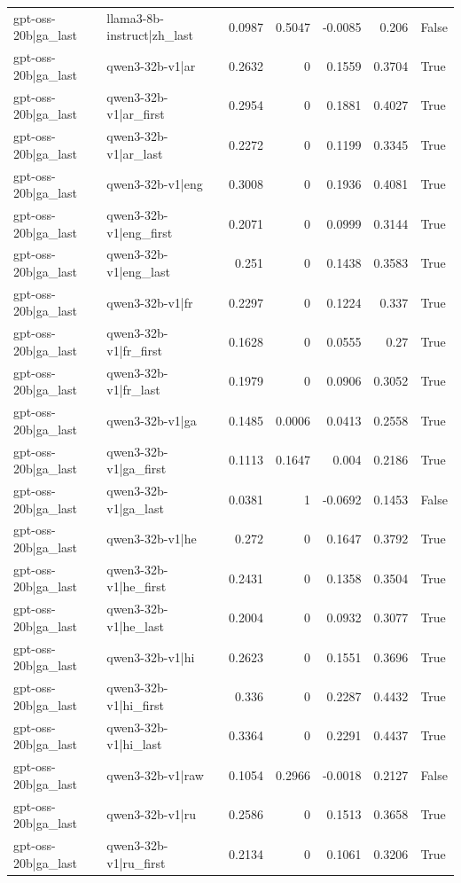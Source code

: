 \begin{table}
\begin{tabular}{l l r r r r l}
gpt-oss-20b|ga_last & llama3-8b-instruct|zh_last & 0.0987 & 0.5047 & -0.0085 & 0.206 & False \\
gpt-oss-20b|ga_last & qwen3-32b-v1|ar & 0.2632 & 0 & 0.1559 & 0.3704 & True \\
gpt-oss-20b|ga_last & qwen3-32b-v1|ar_first & 0.2954 & 0 & 0.1881 & 0.4027 & True \\
gpt-oss-20b|ga_last & qwen3-32b-v1|ar_last & 0.2272 & 0 & 0.1199 & 0.3345 & True \\
gpt-oss-20b|ga_last & qwen3-32b-v1|eng & 0.3008 & 0 & 0.1936 & 0.4081 & True \\
gpt-oss-20b|ga_last & qwen3-32b-v1|eng_first & 0.2071 & 0 & 0.0999 & 0.3144 & True \\
gpt-oss-20b|ga_last & qwen3-32b-v1|eng_last & 0.251 & 0 & 0.1438 & 0.3583 & True \\
gpt-oss-20b|ga_last & qwen3-32b-v1|fr & 0.2297 & 0 & 0.1224 & 0.337 & True \\
gpt-oss-20b|ga_last & qwen3-32b-v1|fr_first & 0.1628 & 0 & 0.0555 & 0.27 & True \\
gpt-oss-20b|ga_last & qwen3-32b-v1|fr_last & 0.1979 & 0 & 0.0906 & 0.3052 & True \\
gpt-oss-20b|ga_last & qwen3-32b-v1|ga & 0.1485 & 0.0006 & 0.0413 & 0.2558 & True \\
gpt-oss-20b|ga_last & qwen3-32b-v1|ga_first & 0.1113 & 0.1647 & 0.004 & 0.2186 & True \\
gpt-oss-20b|ga_last & qwen3-32b-v1|ga_last & 0.0381 & 1 & -0.0692 & 0.1453 & False \\
gpt-oss-20b|ga_last & qwen3-32b-v1|he & 0.272 & 0 & 0.1647 & 0.3792 & True \\
gpt-oss-20b|ga_last & qwen3-32b-v1|he_first & 0.2431 & 0 & 0.1358 & 0.3504 & True \\
gpt-oss-20b|ga_last & qwen3-32b-v1|he_last & 0.2004 & 0 & 0.0932 & 0.3077 & True \\
gpt-oss-20b|ga_last & qwen3-32b-v1|hi & 0.2623 & 0 & 0.1551 & 0.3696 & True \\
gpt-oss-20b|ga_last & qwen3-32b-v1|hi_first & 0.336 & 0 & 0.2287 & 0.4432 & True \\
gpt-oss-20b|ga_last & qwen3-32b-v1|hi_last & 0.3364 & 0 & 0.2291 & 0.4437 & True \\
gpt-oss-20b|ga_last & qwen3-32b-v1|raw & 0.1054 & 0.2966 & -0.0018 & 0.2127 & False \\
gpt-oss-20b|ga_last & qwen3-32b-v1|ru & 0.2586 & 0 & 0.1513 & 0.3658 & True \\
gpt-oss-20b|ga_last & qwen3-32b-v1|ru_first & 0.2134 & 0 & 0.1061 & 0.3206 & True \\

\end{tabular}
\end{table}
